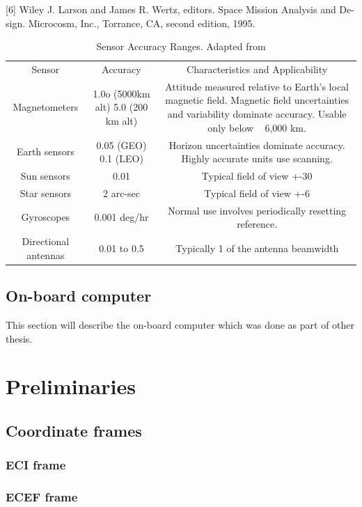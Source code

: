 \documentclass[12pt,a4paper,oneside]{article}
\begin{document}
[6] Wiley J. Larson and James R. Wertz, editors. Space Mission Analysis and De-
sign. Microcosm, Inc., Torrance, CA, second edition, 1995.
\begin{table}[ht]

\begin{tabular}{ccc}
Sensor & Accuracy & Characteristics and Applicability \\ 
Magnetometers & 1.0o (5000km alt) 5.0 (200 km alt) & Attitude measured relative to Earth’s local magnetic field. Magnetic field uncertainties and variability dominate accuracy. Usable only below ~ 6,000 km. \\ 
Earth sensors & 0.05 (GEO) 0.1 (LEO) & Horizon uncertainties dominate accuracy. Highly accurate units use scanning. \\ 
Sun sensors & 0.01 & Typical field of view +-30 \\ 
Star sensors & 2 arc-sec & Typical field of view +-6 \\ 
Gyroscopes & 0.001 deg/hr & Normal use involves periodically resetting reference. \\ 
Directional antennas & 0.01 to 0.5 & Typically 1 of the antenna beamwidth

\end{tabular} 
\caption{Sensor Accuracy Ranges. Adapted from \cite{hall2003spacecraft}}

\end{table}
\cite{lima2000comparison}

\subsection{On-board computer}
This section will describe the on-board computer which was done as part of other thesis.

\newpage
\section{Preliminaries}
\subsection{Coordinate frames}
\subsubsection{ECI frame}
\subsubsection{ECEF frame}
\end{document}
